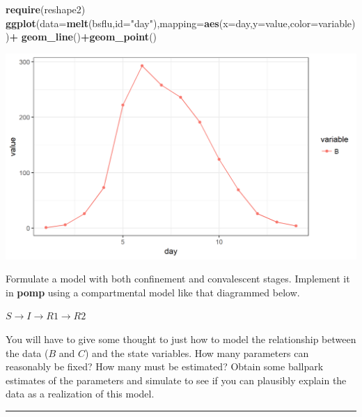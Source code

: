 \documentclass[]{article}
\newenvironment{Shaded}{\begin{snugshade}}{\end{snugshade}}
\newcommand{\KeywordTok}[1]{\textcolor[rgb]{0.13,0.29,0.53}{\textbf{#1}}}
\newcommand{\DataTypeTok}[1]{\textcolor[rgb]{0.13,0.29,0.53}{#1}}
\newcommand{\StringTok}[1]{\textcolor[rgb]{0.31,0.60,0.02}{#1}}
\newcommand{\OperatorTok}[1]{\textcolor[rgb]{0.81,0.36,0.00}{\textbf{#1}}}
\newcommand{\NormalTok}[1]{#1}
\begin{document}
\begin{Shaded}
\begin{Highlighting}[]
\KeywordTok{require}\NormalTok{(reshape2)}
\KeywordTok{ggplot}\NormalTok{(}\DataTypeTok{data=}\KeywordTok{melt}\NormalTok{(bsflu,}\DataTypeTok{id=}\StringTok{"day"}\NormalTok{),}\DataTypeTok{mapping=}\KeywordTok{aes}\NormalTok{(}\DataTypeTok{x=}\NormalTok{day,}\DataTypeTok{y=}\NormalTok{value,}\DataTypeTok{color=}\NormalTok{variable))}\OperatorTok{+}
\StringTok{  }\KeywordTok{geom_line}\NormalTok{()}\OperatorTok{+}\KeywordTok{geom_point}\NormalTok{()}
\end{Highlighting}
\end{Shaded}

\begin{center}\includegraphics{figure/notes11-bsflu-plot2-1} \end{center}

Formulate a model with both confinement and convalescent stages.
Implement it in \textbf{pomp} using a compartmental model like that
diagrammed below.

$S\longrightarrow I \longrightarrow R1\longrightarrow R2$

\hypertarget{htmlwidget-fcce0d5c6205a6196b75}{}

You will have to give some thought to just how to model the relationship
between the data (\(B\) and \(C\)) and the state variables. How many
parameters can reasonably be fixed? How many must be estimated? Obtain
some ballpark estimates of the parameters and simulate to see if you can
plausibly explain the data as a realization of this model.

\begin{center}\rule{0.5\linewidth}{\linethickness}\end{center}
\end{document}
